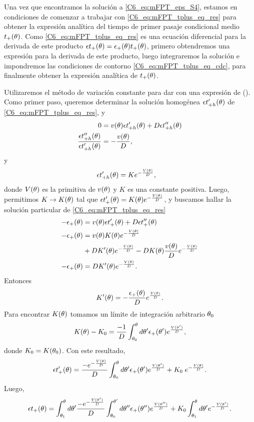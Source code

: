 \documentclass[./main.tex]{subfiles}
\begin{document}
Una vez que encontramos la solución a \ref{C6_eq:mFPT_eps_S4}, estamos en condiciones de comenzar a trabajar con \ref{C6_eq:mFPT_tplus_eq_res} para obtener la expresión analítica del tiempo de primer pasaje condicional medio $t_{+}(\theta)$. Como \ref{C6_eq:mFPT_tplus_eq_res} es una ecuación diferencial para la derivada de este producto $ \epsilon t_+(\theta) = \epsilon_{+}(\theta) t_{+}(\theta) $,  primero obtendremos una expresión para la derivada de este producto, luego integraremos la solución e impondremos las condiciones de contorno \ref{C6_eq:mFPT_tplus_eq_cdc}, para finalmente obtener la expresión analítica de  $t_{+}(\theta)$.


Utilizaremos el método de variación constante para dar con una expresión de \Depstplus(\xx). Como primer paso, queremos determinar la solución homogénea $\epsilon t_{+h} '(\theta)$ de \ref{C6_eq:mFPT_tplus_eq_res}, y
\begin{align}
    0 &= v(\theta) \epsilon t_{+h} '(\theta)  + D \epsilon t_{+h} ''(\theta)\\
    \frac{\epsilon t_{+h} ''(\theta)}{\epsilon t_{+h} '(\theta)} &= - \frac{v(\theta)}{D}, 
\end{align}
y
\begin{align}
   \epsilon t_{+h} '(\theta) & = K  e^{- \frac{V(\theta)}{D}},
\end{align}
donde $V(\theta)$ es la primitiva de $v(\theta)$ y $K$ es una constante positiva.
Luego, permitimos $K \rightarrow   K(\theta)$ tal que $\epsilon t_+ '(\theta) = K(\theta) e^{- \frac{V(\theta)}{D}}$, y buscamos hallar la solución particular de \ref{C6_eq:mFPT_tplus_eq_res}
\begin{align}
    - \epsilon_{+}(\theta) &= v(\theta) \epsilon t_+ '(\theta) + D \epsilon t_+ ''(\theta)\\
    - \epsilon_{+}(\theta) &= v(\theta) K(\theta) e^{- \frac{V(\theta)}{D}}  \nonumber \\
    & + D K'(\theta)e^{- \frac{V(\theta)}{D}} - D K(\theta) \frac{v(\theta)}{D} e^{- \frac{V(\theta)}{D}} \\
    - \epsilon_{+}(\theta) &=  D K'(\theta)e^{- \frac{V(\theta)}{D}} .
\end{align}
Entonces
\begin{align}
         K'(\theta) = - \frac{\epsilon_{+}(\theta)}{D} e^{ \frac{V(\theta)}{D}} .
\end{align}
Para encontrar $K(\theta)$ tomamos un límite de integración arbitrario $\theta_{0}$
\begin{align}
         K(\theta) - K_0 = \frac{-1}{D} \int_{\theta_0}^\theta d\theta' \epsilon_{+}(\theta') e^{ \frac{V(\theta')}{D}},
\end{align}
donde $K_0 = K(\theta_0)$. Con este resultado, 
\begin{align}
    \epsilon t_+ '(\theta) = \frac{-e^{- \frac{V(\theta)}{D}}}{D} \int_{\theta_0}^\theta d\theta' \epsilon_{+}(\theta') e^{ \frac{V(\theta')}{D}} + K_0 \; e^{- \frac{V(\theta)}{D}} .
\end{align}
Luego, 
\begin{align}
   \epsilon t_+(\theta) = \int_{\theta_1}^{\theta} d\theta'  \frac{- e^{- \frac{V(\theta')}{D}} }{D} \int_{\theta_0}^{\theta'} d \theta'' \epsilon_{+}(\theta'') e^{ \frac{V(\theta'')}{D}} + K_0 \int_{\theta_1}^{\theta} d\theta'  e^{- \frac{V(\theta')}{D}}  .
\end{align}
\end{document}
